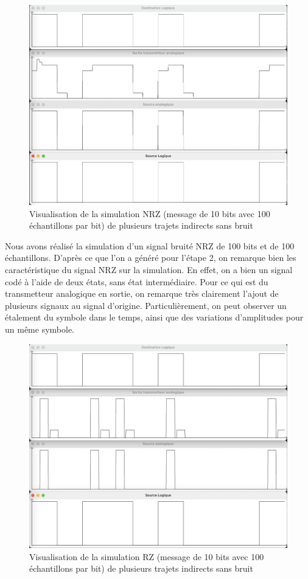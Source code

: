 \begin{figure}[H]
    \centering
    \includegraphics[width=\textwidth]{img/etape4a_ti_multiples_NRZ.png}
    \caption{Visualisation de la simulation NRZ (message de 10 bits avec 100 échantillons par bit) de plusieurs trajets indirects sans bruit}
    \label{fig:etape4a_ti_multiples_NRZ}
\end{figure}

Nous avons réalisé la simulation d'un signal bruité NRZ de 100 bits et de 100 échantillons. D'après ce que l'on a généré pour l'étape 2, on remarque bien les caractéristique du signal NRZ sur la simulation. En effet, on a bien un signal codé à l'aide de deux états, sans état intermédiaire. Pour ce qui est du transmetteur analogique en sortie, on remarque très clairement l'ajout de plusieurs signaux au signal d'origine. Particulièrement, on peut observer un étalement du symbole dans le temps, ainsi que des variations d'amplitudes pour un même symbole.

\begin{figure}[H]
    \centering
    \includegraphics[width=\textwidth]{img/etape4a_ti_multiples_RZ.png}
    \caption{Visualisation de la simulation RZ (message de 10 bits avec 100 échantillons par bit) de plusieurs trajets indirects sans bruit}
    \label{fig:etape4a_ti_multiples_RZ}
\end{figure}

